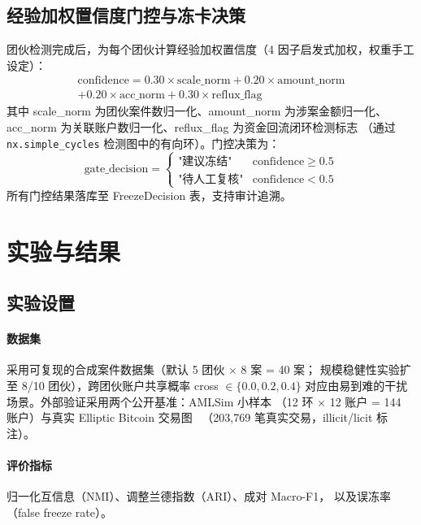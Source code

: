 \documentclass[12pt,a4paper]{ctexart}
\begin{document}
\subsection{经验加权置信度门控与冻卡决策}

团伙检测完成后，为每个团伙计算经验加权置信度（4 因子启发式加权，权重手工设定）：
\begin{equation}
\begin{aligned}
\text{confidence} = 0.30 \times \text{scale\_norm} + 0.20 \times \text{amount\_norm} \\
+ 0.20 \times \text{acc\_norm} + 0.30 \times \text{reflux\_flag}
\end{aligned}
\end{equation}
其中 scale\_norm 为团伙案件数归一化、amount\_norm 为涉案金额归一化、
acc\_norm 为关联账户数归一化、reflux\_flag 为资金回流闭环检测标志
（通过 \texttt{nx.simple\_cycles} 检测图中的有向环）。门控决策为：
\[
\text{gate\_decision} =
\begin{cases}
\text{"建议冻结"} & \text{confidence} \ge 0.5 \\
\text{"待人工复核"} & \text{confidence} < 0.5
\end{cases}
\]
所有门控结果落库至 FreezeDecision 表，支持审计追溯。

\section{实验与结果}

\subsection{实验设置}

\paragraph{数据集} 采用可复现的合成案件数据集（默认 5 团伙 $\times$ 8 案 = 40 案；
规模稳健性实验扩至 8/10 团伙），跨团伙账户共享概率 cross $\in \{0.0, 0.2, 0.4\}$
对应由易到难的干扰场景。外部验证采用两个公开基准：AMLSim 小样本
（12 环 $\times$ 12 账户 = 144 账户）与真实 Elliptic Bitcoin 交易图~\cite{weber2019elliptic}
（203{,}769 笔真实交易，illicit/licit 标注）。

\paragraph{评价指标} 归一化互信息（NMI）、调整兰德指数（ARI）、成对 Macro-F1，
以及误冻率（false freeze rate）。
\end{document}
